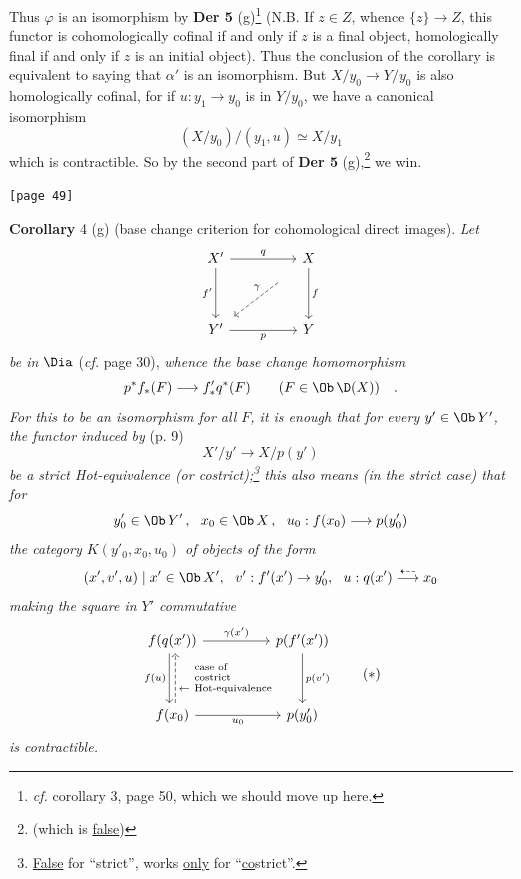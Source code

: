 
\noindent Thus $\varphi$ is an isomorphism by \textbf{Der 5} (g)\footnote[17]{\textit{cf.} corollary 3, page 50, which we should move up here.} (N.B. If $z \in Z$, whence $\{z\} \to Z$, this functor is cohomologically cofinal if and only if $z$ is a final object, homologically final if and only if $z$ is an initial object). Thus the conclusion of the corollary is equivalent to saying that $\alpha'$ is an isomorphism. But $X/y_{0} \to Y/y_{0}$ is also homologically cofinal, for if $u : y_{1} \to y_{0}$ is in $Y/y_{0}$, we have a canonical isomorphism
\[ (X/y_{0})/(y_{1}, u) \simeq X/y_{1} \]
which is contractible. So by the second part of \textbf{Der 5} (g),\footnote[18]{(which is \underline{false})} we win.

\noindent{}\texttt{[page 49]}

\noindent\textbf{Corollary} 4 (g) (base change criterion for cohomological direct images). \textit{Let}
\[
\begin{tikzcd}[row sep=huge, column sep=huge]
X' \arrow[r, "q"] \arrow[d, "f'"'] & X \arrow[d, "f"] \arrow[dl, dashed, "\gamma"', shorten <=4ex, shorten >=1ex] \\
Y' \arrow[r, "p"'] & Y
\end{tikzcd}
\]
\textit{be in} $\Dia$ (\textit{cf.} page 30), \textit{whence the base change homomorphism}
\[ p^{*} f_{*}(F) \longrightarrow f'_{*} q^{*}(F) \qquad (F \in \Ob\,\D(X)) \quad . \]
\textit{For this to be an isomorphism for all $F$, it is enough that for every $y' \in \Ob\,Y'$, the functor induced by} (p. 9)
\[ X'/y' \longrightarrow X/p(y') \]
\textit{be a strict Hot-equivalence (or costrict);\footnote[19]{\underline{False} for ``strict'', works \underline{only} for ``\underline{\underline{co}}strict''.} this also means (in the strict case) that for}
\[ y'_{0} \in \Ob\,Y' \,,\ \ x_{0} \in \Ob\,X \,,\ \ u_{0} : f(x_{0}) \longrightarrow p(y'_{0}) \]
\textit{the category $K(y'_{0}, x_{0}, u_{0})$ of objects of the form}
\[ (x', v', u) \mid x' \in \Ob\,X',\ \ v' : f'(x') \to y'_{0},\ \ u : q(x') \overset{\dashleftarrow}{\longrightarrow} x_{0} \]
\textit{making the square in $Y'$ commutative}
\[
\begin{tikzcd}[row sep=huge, column sep=huge]
f(q(x')) \arrow[r, "\gamma(x')"] \arrow[d, shift right=0.5ex, "f(u)"'] & p(f'(x')) \arrow[d, "p(v')"] \\
f(x_{0}) \arrow[r, "u_{0}"'] \arrow[u, dashed, shift right=0.5ex, "\leftarrow\ \text{\scriptsize\shortstack[l]{case of\\costrict\\Hot-equivalence}}"'] & p(y'_{0})
\end{tikzcd}
\tag*{$(*)$}
\]
\textit{is contractible.}


